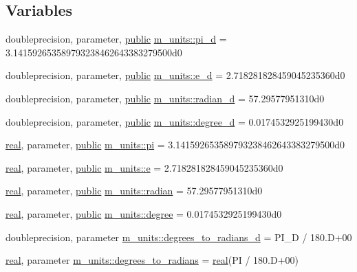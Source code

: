 \subsection*{Variables}
\begin{DoxyCompactItemize}
\item 
doubleprecision, parameter, \hyperlink{M__stopwatch_83_8txt_a2f74811300c361e53b430611a7d1769f}{public} \hyperlink{namespacem__units_a4c458c5da447708cb6e03ec4c3469dcd}{m\+\_\+units\+::pi\+\_\+d} = 3.\+141592653589793238462643383279500d0
\item 
doubleprecision, parameter, \hyperlink{M__stopwatch_83_8txt_a2f74811300c361e53b430611a7d1769f}{public} \hyperlink{namespacem__units_a758f857fe2277b6576ffae5654544405}{m\+\_\+units\+::e\+\_\+d} = 2.\+718281828459045235360d0
\item 
doubleprecision, parameter, \hyperlink{M__stopwatch_83_8txt_a2f74811300c361e53b430611a7d1769f}{public} \hyperlink{namespacem__units_ae88c8fb74ff03da879e668cfe0635550}{m\+\_\+units\+::radian\+\_\+d} = 57.\+29577951310d0
\item 
doubleprecision, parameter, \hyperlink{M__stopwatch_83_8txt_a2f74811300c361e53b430611a7d1769f}{public} \hyperlink{namespacem__units_a00df65cb71220d4fe1c654d5b4ba4851}{m\+\_\+units\+::degree\+\_\+d} = 0.\+0174532925199430d0
\item 
\hyperlink{read__watch_83_8txt_abdb62bde002f38ef75f810d3a905a823}{real}, parameter, \hyperlink{M__stopwatch_83_8txt_a2f74811300c361e53b430611a7d1769f}{public} \hyperlink{namespacem__units_a7f9e69ec2fe4e5a5c49f7dce15a48a67}{m\+\_\+units\+::pi} = 3.\+141592653589793238462643383279500d0
\item 
\hyperlink{read__watch_83_8txt_abdb62bde002f38ef75f810d3a905a823}{real}, parameter, \hyperlink{M__stopwatch_83_8txt_a2f74811300c361e53b430611a7d1769f}{public} \hyperlink{namespacem__units_a14ea25237dbdbd5c868d2729c67b2abd}{m\+\_\+units\+::e} = 2.\+718281828459045235360d0
\item 
\hyperlink{read__watch_83_8txt_abdb62bde002f38ef75f810d3a905a823}{real}, parameter, \hyperlink{M__stopwatch_83_8txt_a2f74811300c361e53b430611a7d1769f}{public} \hyperlink{namespacem__units_ae9442f0901c0238170aff7cf946fb0c1}{m\+\_\+units\+::radian} = 57.\+29577951310d0
\item 
\hyperlink{read__watch_83_8txt_abdb62bde002f38ef75f810d3a905a823}{real}, parameter, \hyperlink{M__stopwatch_83_8txt_a2f74811300c361e53b430611a7d1769f}{public} \hyperlink{namespacem__units_a3ffc2cf87c0db17c71fa0a7bbee8eb9c}{m\+\_\+units\+::degree} = 0.\+0174532925199430d0
\item 
doubleprecision, parameter \hyperlink{namespacem__units_a74de2022908d613a91b83f9521460f6f}{m\+\_\+units\+::degrees\+\_\+to\+\_\+radians\+\_\+d} = P\+I\+\_\+D / 180.\+D+00
\item 
\hyperlink{read__watch_83_8txt_abdb62bde002f38ef75f810d3a905a823}{real}, parameter \hyperlink{namespacem__units_a37687a78d45e4bcf4fa6b76ca11eb02b}{m\+\_\+units\+::degrees\+\_\+to\+\_\+radians} = \hyperlink{read__watch_83_8txt_abdb62bde002f38ef75f810d3a905a823}{real}(PI / 180.\+D+00)
\end{DoxyCompactItemize}
